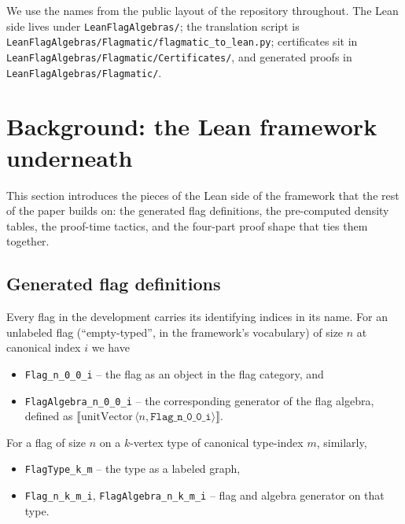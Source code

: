 \documentclass[11pt]{article}
\begin{document}
We use the names from the public layout of the repository throughout. The
Lean side lives under \texttt{LeanFlagAlgebras/}; the translation script is
\texttt{LeanFlagAlgebras/Flagmatic/flagmatic\_to\_lean.py}; certificates
sit in \texttt{LeanFlagAlgebras/Flagmatic/Certificates/}, and generated
proofs in \texttt{LeanFlagAlgebras/Flagmatic/}.

\section{Background: the Lean framework underneath}
\label{sec:background}

This section introduces the pieces of the Lean side of the framework that
the rest of the paper builds on: the generated flag definitions, the
pre-computed density tables, the proof-time tactics, and the
four-part proof shape that ties them together.

\subsection{Generated flag definitions}
\label{sec:flag-defs}

Every flag in the development carries its identifying indices in its name.
For an unlabeled flag (``empty-typed'', in the framework's vocabulary) of
size $n$ at canonical index $i$ we have
\begin{itemize}
  \item \texttt{Flag\_n\_0\_0\_i} -- the flag as an object in the flag
    category, and
  \item \texttt{FlagAlgebra\_n\_0\_0\_i} -- the corresponding generator of
    the flag algebra, defined as $\llbracket
    \mathrm{unitVector}\,\langle n, \texttt{Flag\_n\_0\_0\_i}\rangle\rrbracket$.
\end{itemize}
For a flag of size $n$ on a $k$-vertex type of canonical type-index $m$,
similarly,
\begin{itemize}
  \item \texttt{FlagType\_k\_m} -- the type as a labeled graph,
  \item \texttt{Flag\_n\_k\_m\_i}, \texttt{FlagAlgebra\_n\_k\_m\_i} --
    flag and algebra generator on that type.
\end{itemize}
\end{document}
